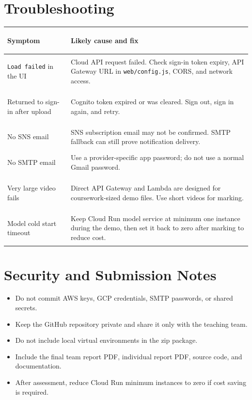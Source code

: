 \documentclass[12pt,a4paper]{article}
\begin{document}
\section{Troubleshooting}
\small
\begin{tabularx}{\textwidth}{>{\bfseries\raggedright\arraybackslash}p{39mm}X}
\toprule
\textbf{Symptom} & \textbf{Likely cause and fix}\\
\midrule
\texttt{Load failed} in the UI & Cloud API request failed. Check sign-in token expiry, API Gateway URL in \texttt{web/config.js}, CORS, and network access.\\
Returned to sign-in after upload & Cognito token expired or was cleared. Sign out, sign in again, and retry.\\
No SNS email & SNS subscription email may not be confirmed. SMTP fallback can still prove notification delivery.\\
No SMTP email & Use a provider-specific app password; do not use a normal Gmail password.\\
Very large video fails & Direct API Gateway and Lambda are designed for coursework-sized demo files. Use short videos for marking.\\
Model cold start timeout & Keep Cloud Run model service at minimum one instance during the demo, then set it back to zero after marking to reduce cost.\\
\bottomrule
\end{tabularx}
\normalsize

\section{Security and Submission Notes}
\begin{itemize}
  \item Do not commit AWS keys, GCP credentials, SMTP passwords, or shared secrets.
  \item Keep the GitHub repository private and share it only with the teaching team.
  \item Do not include local virtual environments in the zip package.
  \item Include the final team report PDF, individual report PDF, source code, and documentation.
  \item After assessment, reduce Cloud Run minimum instances to zero if cost saving is required.
\end{itemize}
\end{document}
